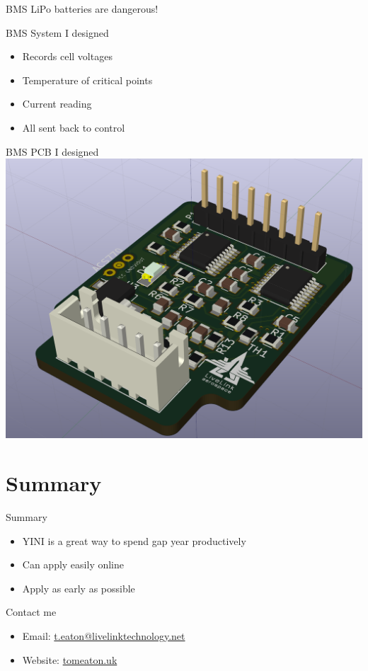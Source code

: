 \documentclass{beamer}
\begin{document}
\begin{frame}{BMS}
	LiPo batteries are dangerous!
	\centering
\end{frame}

\begin{frame}{BMS}
	System I designed
	\begin{itemize}
		\item
			Records cell voltages
		\item
			Temperature of critical points
		\item 
			Current reading
		\item 
			All sent back to control
	\end{itemize}
\end{frame}

\begin{frame}{BMS}
        \centering
        PCB I designed\\ 
        \includegraphics[scale=.1]{pcb.png}
\end{frame}

\section*{Summary}

\begin{frame}{Summary}

  \begin{itemize}
  \item
	  \alert{YINI} is a great way to spend gap year productively
  \item
	  Can apply easily online
  \item
	  Apply as early as possible
  \end{itemize}
\end{frame}

\begin{frame}{Contact me}
    \begin{itemize}
        \item Email: \url{t.eaton@livelinktechnology.net}
        \item
            Website: \url{tomeaton.uk}
    \end{itemize}
\end{frame} 
\end{document}
